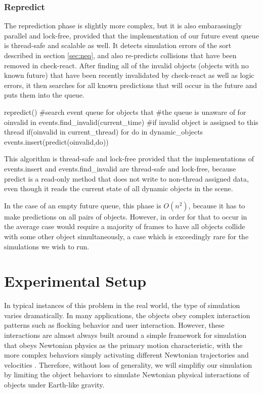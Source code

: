 \documentclass[conference]{IEEEtran}
\begin{document}
\subsubsection{Repredict}
The reprediction phase is slightly more complex, but it is also embarassingly parallel and lock-free, provided that the implementation of our future event queue is thread-safe and scalable as well.  It detects simulation errors of the sort described in section \ref{sec:neq}, and also re-predicts collisions
that have been removed in check-react.  After finding all of the invalid objects (objects with no known future) that have been recently invalidated by check-react as well as logic errors, it then
searches for all known predictions that will occur in the future and puts them into the queue.  
\begin{verbatimtab}[3]
repredict()
{
   #search event queue for objects that
   #the queue is unaware of
   for oinvalid in events.find_invalid(current_time)
   {
        #if invalid object is assigned to this thread
        if(oinvalid in current_thread)
        {
		for do in dynamic_objects
		{
			events.insert(predict(oinvalid,do))
		}
	}
   }
}
\end{verbatimtab}
This algorithm is thread-safe and lock-free provided that the implementations of events.insert and events.find\_invalid are thread-safe and lock-free, because predict is a read-only method that 
does not write to non-thread assigned data, even though it reads the current state of all dynamic objects in the scene.

In the case of an empty future queue, this phase is $O(n^2)$, because it has to make predictions on all pairs of objects.  However, in order for that to occur in the average case would require a majority of frames to have all objects collide
with some other object simultaneously, a case which is exceedingly rare for the simulations we wish to run.

\section{Experimental Setup}%

In typical instances of this problem in the real world, the type of simulation varies dramatically. In many applications, the objects obey complex interaction patterns such as flocking behavior and user interaction.  However, these interactions are almost always built around a simple framework for simulation that obeys Newtonian physics as the primary motion characteristic, with the more complex
behaviors simply activating different Newtonian trajectories and velocities \cite{Jadbabaie02coordinationof}.  Therefore, without loss of generality, we will simplifiy our simulation by limiting the object behaviors to simulate Newtonian physical interactions of objects under Earth-like gravity.
\end{document}
